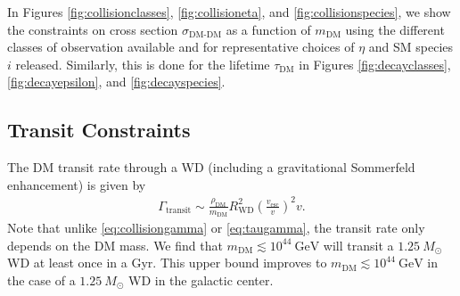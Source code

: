 \documentclass[twocolumn,showpacs,preprintnumbers,amsmath,amssymb,prd]{revtex4}
\newcommand{\GeV}{\text{GeV}}
\def\r{\right)}
\def\l{\left(}
\begin{document}
In Figures \ref{fig:collisionclasses}, \ref{fig:collisioneta}, and \ref{fig:collisionspecies}, we show the constraints on cross section $\sigma_\text{DM-DM}$ as a function of $m_\text{DM}$ using the different classes of observation available and for representative choices of $\eta$ and SM species $i$ released.
Similarly, this is done for the lifetime $\tau_\text{DM}$ in Figures \ref{fig:decayclasses}, \ref{fig:decayepsilon}, and \ref{fig:decayspecies}.
 

\subsection{Transit Constraints}
\label{sec:TransitConstraints}

The DM transit rate through a WD (including a gravitational Sommerfeld enhancement) is given by
\begin{align}
\Gamma_\text{transit} \sim \frac{\rho_{\text{DM}}}{m_\text{DM}} R_\text{WD}^2 \l\frac{v_\text{esc}}{v}\r^2 v.
\label{eq:TransitFluxCondition}
\end{align}
Note that unlike \eqref{eq:collisiongamma} or \eqref{eq:taugamma}, the transit rate only depends on the DM mass.
We find that $m_\text{DM} \lesssim 10^{44} ~\GeV$ will transit a $1.25 ~M_{\odot}$ WD at least once in a Gyr.
This upper bound improves to $m_\text{DM} \lesssim 10^{44} ~\GeV$ in the case of a $1.25 ~M_{\odot}$ WD in the galactic center.
\end{document}
